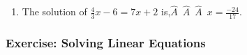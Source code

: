 {\begin{mdframed}[linewidth=4, leftmargin=40, rightmargin=40]
\begin{exercise}
\begin{enumerate}[noitemsep, label=\textbf{Step} \textbf{\arabic*}. ]
        
        \label{m39241*id148292}Since both sides are equal to \begin{math}\frac{-134}{17}\end{math}, the answer is correct.\par 
        \item  
        \label{m39241*id148321}The solution of \begin{math}\frac{4}{3}x-6=7x+2\end{math} is,\ensuremath{\hat{A}}~\ensuremath{\hat{A}}~\ensuremath{\hat{A}}~\begin{math}x=\frac{-24}{17}\end{math}.
 \par 
        \end{enumerate}
         

    \end{exercise}
    \end{mdframed}
    }
    \noindent
  
\label{m39241*secfhsst!!!underscore!!!id1862}
            \subsubsection{ Exercise: Solving Linear Equations }
            \nopagebreak
            
